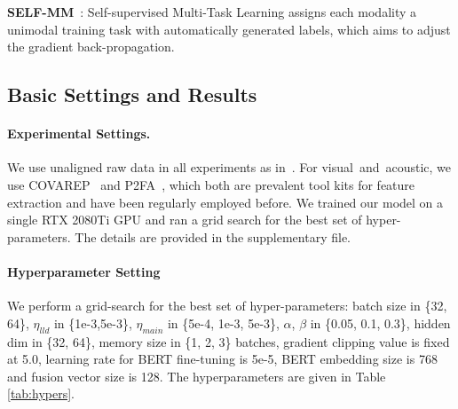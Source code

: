 \documentclass[11pt]{article}
\newcommand{\mv}{visual}
\newcommand{\ma}{acoustic}
\begin{document}
\textbf{SELF-MM}~\citep{yu2021learning}: Self-supervised Multi-Task Learning assigns each modality a unimodal training task with automatically generated labels, which aims to adjust the gradient back-propagation.



\subsection{Basic Settings and Results}
\paragraph{Experimental Settings.} 
We use unaligned raw data in all experiments as in~\citet{yu2021learning}.
For \mv~and~\ma, we use COVAREP~\citep{degottex2014covarep} and P2FA~\citep{yuan2008speaker}, which both are prevalent tool kits for feature extraction and have been regularly employed before.
We trained our model on a single RTX 2080Ti GPU and ran a grid search for the best set of hyper-parameters. 
The details are provided in the supplementary file.

\paragraph{Hyperparameter Setting}
We perform a grid-search for the best set of hyper-parameters: batch size in \{32, 64\}, $\eta_{lld}$ in \{1e-3,5e-3\}, $\eta_{main}$ in \{5e-4, 1e-3, 5e-3\}, $\alpha$, $\beta$ in \{0.05, 0.1, 0.3\}, hidden dim in \{32, 64\}, memory size in \{1, 2, 3\} batches, gradient clipping value is fixed at 5.0, learning rate for BERT fine-tuning is 5e-5, BERT embedding size is 768 and fusion vector size is 128. The hyperparameters are given in Table \ref{tab:hypers}.

\begin{table}[ht!]
    \centering
{}
    \caption{Hyperparameters for best performance.}
    \label{tab:hypers}
\end{table} 
\end{document}
